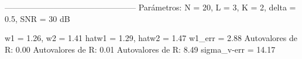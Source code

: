 
------------------------------------------------
Parámetros:
N = 20, L = 3, K = 2, delta = 0.5, SNR = 30 dB

w1 = 1.26, w2 = 1.41 
hat{w1} = 1.29, hat{w2} = 1.47
w1_{err} = 2.88 %
Autovalores de R: 0.00
Autovalores de R: 0.01
Autovalores de R: 8.49
sigma_v-err = 14.17 %
